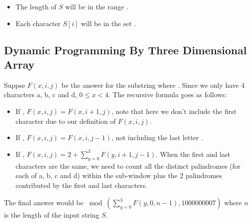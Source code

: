 \begin{itemize}
\item The length of $S$ will be in the range \fcj{[1, 1000]}.
\item Each character $S[i]$ will be in the set \fcj{['a', 'b', 'c', 'd']}.
\end{itemize}

\subsection{Dynamic Programming By Three Dimensional Array}
Suppse $F(x,i,j)$ be the answer for the substring  where . Since we only have 4 characters a, b, c and d, $0 \leq x < 4$. The recursive formula goes as follows:

\begin{itemize}
\item If , $F(x,i,j) = F(x,i+1,j)$, note that here we don't include the first character  due to our definition of $F(x,i,j)$.

\item If , $F(x,i,j) = F(x, i, j-1)$, not including the last letter .

\item If , $F(x,i,j) = 2 + \sum\limits_{y=0}^{3}F(y, i+1,j-1)$. When the first and last characters are the same, we need to count all the distinct palindromes (for each of a, b, c and d) within the sub-window  plus the 2 palindromes contributed by the first and last characters.

\end{itemize}

The final answer would be $\bmod(\sum\limits_{y=0}^{3}F(y,0,n-1), 1000000007)$ where $n$ is the length of the input string $S$. 

